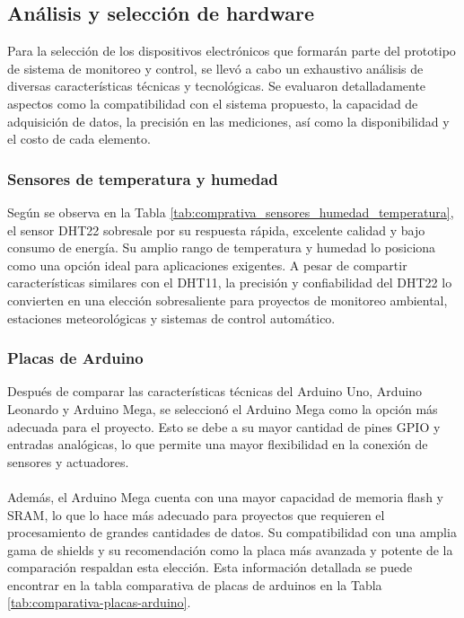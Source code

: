 \subsection{Análisis y selección de hardware}
Para la selección de los dispositivos electrónicos que formarán parte del prototipo de sistema de monitoreo y control, se llevó a cabo un exhaustivo análisis de diversas características técnicas y tecnológicas. Se evaluaron detalladamente aspectos como la compatibilidad con el sistema propuesto, la capacidad de adquisición de datos, la precisión en las mediciones, así como la disponibilidad y el costo de cada elemento.

\subsubsection*{Sensores de temperatura y humedad}
Según se observa en la Tabla \ref{tab:comprativa_sensores_humedad_temperatura}, el sensor DHT22 sobresale por su respuesta rápida, excelente calidad y bajo consumo de energía. Su amplio rango de temperatura y humedad lo posiciona como una opción ideal para aplicaciones exigentes. A pesar de compartir características similares con el DHT11, la precisión y confiabilidad del DHT22 lo convierten en una elección sobresaliente para proyectos de monitoreo ambiental, estaciones meteorológicas y sistemas de control automático.


\subsubsection*{Placas de Arduino}
Después de comparar las características técnicas del Arduino Uno, Arduino Leonardo y Arduino Mega, se seleccionó el Arduino Mega como la opción más adecuada para el proyecto. Esto se debe a su mayor cantidad de pines GPIO y entradas analógicas, lo que permite una mayor flexibilidad en la conexión de sensores y actuadores.
\\
\\ 
Además, el Arduino Mega cuenta con una mayor capacidad de memoria flash y SRAM, lo que lo hace más adecuado para proyectos que requieren el procesamiento de grandes cantidades de datos. Su compatibilidad con una amplia gama de shields y su recomendación como la placa más avanzada y potente de la comparación respaldan esta elección. Esta información detallada se puede encontrar en la tabla comparativa de placas de arduinos en la Tabla \ref{tab:comparativa-placas-arduino}.

